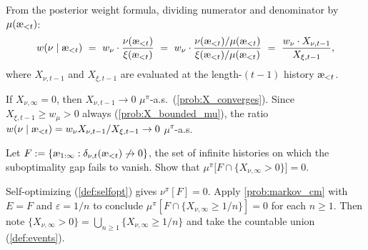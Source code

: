 \documentclass[fontsize=11pt, parskip=half]{scrartcl}
\newcommand{\aes}{\textnormal{\ae}}
\begin{document}
\begin{solution}
From the posterior weight formula, dividing numerator and denominator by $\mu(\aes_{<t})$:
\[
    w(\nu \mid \aes_{<t})
    ~=~ w_\nu \cdot \frac{\nu(\aes_{<t})}{\xi(\aes_{<t})}
    ~=~ w_\nu \cdot \frac{\nu(\aes_{<t})/\mu(\aes_{<t})}{\xi(\aes_{<t})/\mu(\aes_{<t})}
    ~=~ \frac{w_\nu \cdot X_{\nu,t-1}}{X_{\xi,t-1}},
\]
where $X_{\nu,t-1}$ and $X_{\xi,t-1}$ are evaluated at the length-$(t{-}1)$ history $\aes_{<t}$.

If $X_{\nu,\infty} = 0$, then $X_{\nu,t-1} \to 0$ $\mu^\pi$-a.s.\ (\cref{prob:X_converges}). Since $X_{\xi,t-1} \geq w_\mu > 0$ always (\cref{prob:X_bounded_mu}), the ratio $w(\nu \mid \aes_{<t}) = w_\nu X_{\nu,t-1}/X_{\xi,t-1} \to 0$ $\mu^\pi$-a.s.
\end{solution}

\begin{exercise}
\label{prob:delta_transfer}
Let $F := \{\aes_{1:\infty} : \delta_{\nu,t}(\aes_{<t}) \not\to 0\}$, the set of infinite histories on which the suboptimality gap fails to vanish. Show that $\mu^\pi\big[F \cap \{X_{\nu,\infty} > 0\}\big] = 0$.


\begin{hint}
Self-optimizing (\cref{def:selfopt}) gives $\nu^\pi[F] = 0$. Apply \cref{prob:markov_cm} with $E = F$ and $\varepsilon = 1/n$ to conclude $\mu^\pi[F \cap \{X_{\nu,\infty} \geq 1/n\}] = 0$ for each $n \geq 1$. Then note $\{X_{\nu,\infty} > 0\} = \bigcup_{n \geq 1} \{X_{\nu,\infty} \geq 1/n\}$ and take the countable union (\cref{def:events}).
\end{hint}
\end{exercise}
\end{document}
